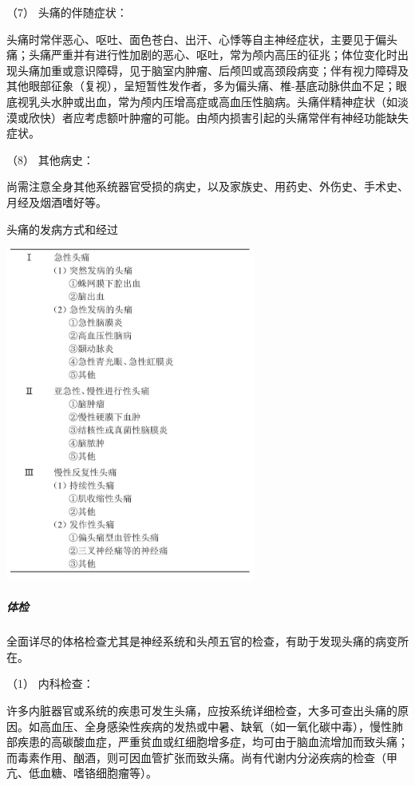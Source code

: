 \hypertarget{text00020.htmlux5cux23CHP1-7-2-1-1-7}{}
（7） 头痛的伴随症状：

头痛时常伴恶心、呕吐、面色苍白、出汗、心悸等自主神经症状，主要见于偏头痛；头痛严重并有进行性加剧的恶心、呕吐，常为颅内高压的征兆；体位变化时出现头痛加重或意识障碍，见于脑室内肿瘤、后颅凹或高颈段病变；伴有视力障碍及其他眼部征象（复视），呈短暂性发作者，多为偏头痛、椎-基底动脉供血不足；眼底视乳头水肿或出血，常为颅内压增高症或高血压性脑病。头痛伴精神症状（如淡漠或欣快）者应考虑额叶肿瘤的可能。由颅内损害引起的头痛常伴有神经功能缺失症状。

\hypertarget{text00020.htmlux5cux23CHP1-7-2-1-1-8}{}
（8） 其他病史：

尚需注意全身其他系统器官受损的病史，以及家族史、用药史、外伤史、手术史、月经及烟酒嗜好等。

\begin{table}[htbp]
\centering
\caption{头痛的发病方式和经过}
\label{tab7-2}
\includegraphics[width=3.22917in,height=4.33333in]{./images/Image00040.jpg}
\end{table}

\subparagraph{体检}

全面详尽的体格检查尤其是神经系统和头颅五官的检查，有助于发现头痛的病变所在。

\hypertarget{text00020.htmlux5cux23CHP1-7-2-1-2-1}{}
（1） 内科检查：

许多内脏器官或系统的疾患可发生头痛，应按系统详细检查，大多可查出头痛的原因。如高血压、全身感染性疾病的发热或中暑、缺氧（如一氧化碳中毒），慢性肺部疾患的高碳酸血症，严重贫血或红细胞增多症，均可由于脑血流增加而致头痛；而毒素作用、酗酒，则可因血管扩张而致头痛。尚有代谢内分泌疾病的检查（甲亢、低血糖、嗜铬细胞瘤等）。

